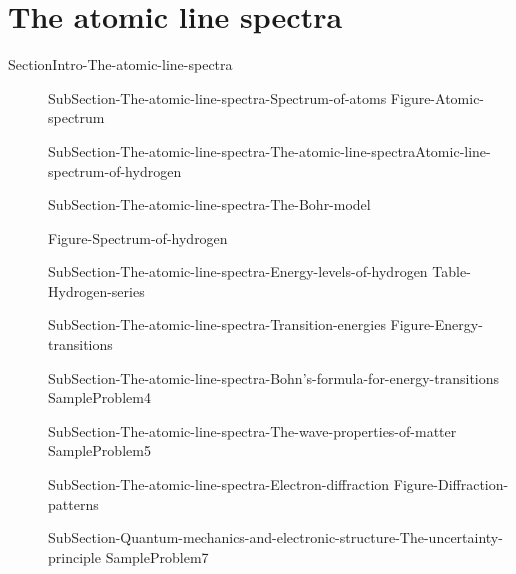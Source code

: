 \documentclass[main.tex]{subfiles}
\newcommand\chapterlabel{Ch-radiation}\setcounter{figurenewcounter}{0}\setcounter{tablenewcounter}{0}\setcounter{formulanewcounter}{0}
\begin{document}
\section{The atomic line spectra}
{SectionIntro-The-atomic-line-spectra}
\sloppy
\begin{description}
\item[]{SubSection-The-atomic-line-spectra-Spectrum-of-atoms}
{Figure-Atomic-spectrum}
\item[]{SubSection-The-atomic-line-spectra-The-atomic-line-spectraAtomic-line-spectrum-of-hydrogen}
\item[]{SubSection-The-atomic-line-spectra-The-Bohr-model}

  {Figure-Spectrum-of-hydrogen}
\item[]{SubSection-The-atomic-line-spectra-Energy-levels-of-hydrogen}
\vspace{-0.5cm}{Figure-Energy-levels-of-hydrogen}
{Table-Hydrogen-series}

\item[]{SubSection-The-atomic-line-spectra-Transition-energies}
{Figure-Energy-transitions}
 \item[]{SubSection-The-atomic-line-spectra-Bohn's-formula-for-energy-transitions}
  {SampleProblem4}
\newpage\vspace{5cm}{Figure-Debroglie}
 \item[]{SubSection-The-atomic-line-spectra-The-wave-properties-of-matter}
  {SampleProblem5}
 \item[]{SubSection-The-atomic-line-spectra-Electron-diffraction}
 {Figure-Diffraction-patterns}
 \item[] {SubSection-Quantum-mechanics-and-electronic-structure-The-uncertainty-principle}
  {SampleProblem7}
\end{description}
\newpage
\end{document}
